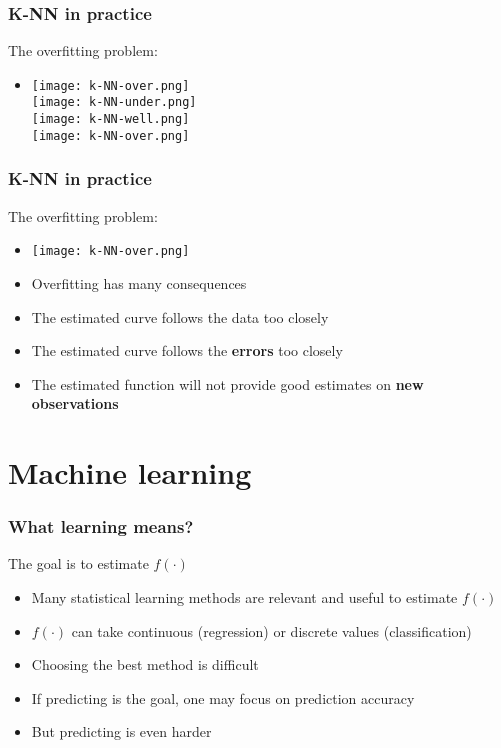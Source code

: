 \documentclass[xcolor=x11names,compress, aspectratio=169]{beamer}
\renewcommand{\(}{\begin{columns}}
\renewcommand{\)}{\end{columns}}
\newcommand{\<}[1]{\begin{column}{#1}}
\renewcommand{\>}{\end{column}}
\begin{document}
\begin{frame}
\frametitle{\textcolor{brique}{ K-NN in practice}}
The overfitting problem: 
\begin{itemize}
\item[] 
    {\texttt{[image: k-NN-over.png]} \\ }
    {\texttt{[image: k-NN-under.png]} \\ }
    {\texttt{[image: k-NN-well.png]} \\ }
    {\texttt{[image: k-NN-over.png]} \\ }  
\end{itemize}
\end{frame}


\begin{frame}
\frametitle{\textcolor{brique}{ K-NN in practice}}
The overfitting problem:
\begin{itemize}[<+->]
\item[] \texttt{[image: k-NN-over.png]} 
\item[] Overfitting has many consequences
\item The estimated curve follows the data too closely
\item The estimated curve follows the \textbf{errors} too closely
\item The estimated function will not provide good estimates on \textbf{new observations}
\end{itemize}
\end{frame}




\section{Machine learning}


\begin{frame}
\frametitle{\textcolor{brique}{ What learning means?}}
The goal is to estimate $f(\cdot)$
\begin{itemize}[<+->]
\item Many statistical learning methods are relevant and useful to estimate $f(\cdot)$
\item $f(\cdot)$ can take continuous (regression) or discrete values (classification)
\item Choosing the best method is difficult
\item If predicting is the goal, one may focus on prediction accuracy
\item But predicting is even harder
\end{itemize}
\end{frame}
\end{document}
